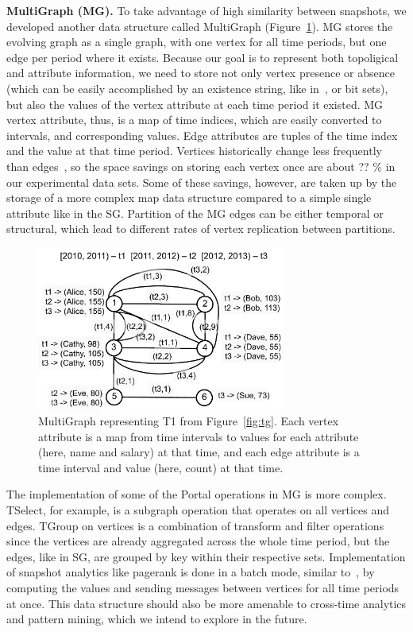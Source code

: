 {\bf MultiGraph (MG).}  To take advantage of high similarity between
snapshots, we developed another data structure called MultiGraph
(Figure~\ref{fig:mg}).  MG stores the evolving graph as a single
graph, with one vertex for all time periods, but one edge per period
where it exists.  Because our goal is to represent both topoligical
and attribute information, we need to store not only vertex presence
or absence (which can be easily accomplished by an existence string,
like in~\cite{Kan2009}, or bit sets), but also the values of the
vertex attribute at each time period it existed.  MG vertex attribute,
thus, is a map of time indices, which are easily converted to
intervals, and corresponding values.  Edge attributes are tuples of
the time index and the value at that time period.  Vertices
historically change less frequently than edges~\cite{?}, so the space
savings on storing each vertex once are about ?? \% in our
experimental data sets.  Some of these savings, however, are taken up
by the storage of a more complex map data structure compared to a
simple single attribute like in the SG.  Partition of the MG edges can
be either temporal or structural, which lead to different rates of
vertex replication between partitions.

\begin{figure}[t!]
\includegraphics[width=3.2in]{figs/mg.pdf}
\caption{MultiGraph representing T1 from Figure~\ref{fig:tg}.  Each
  vertex attribute is a map from time intervals to values for each
  attribute (here, name and salary) at that time, and each edge
  attribute is a time interval and value (here, count) at that time.}
\label{fig:mg}
\end{figure}

The implementation of some of the Portal operations in MG is more
complex.  TSelect, for example, is a subgraph operation that operates
on all vertices and edges.  TGroup on vertices is a combination of
transform and filter operations since the vertices are already
aggregated across the whole time period, but the edges, like in SG,
are grouped by key within their respective sets.  Implementation of
snapshot analytics like pagerank is done in a batch mode, similar
to~\cite{DBLP:journals/tos/MiaoHLWYZPCC15}, by computing the values
and sending messages between vertices for all time periods at once.
This data structure should also be more amenable to cross-time
analytics and pattern mining, which we intend to explore in the
future.

